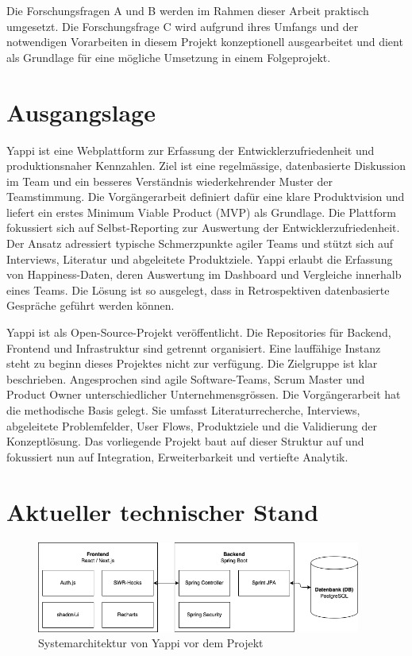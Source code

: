 \documentclass[12pt,a4paper]{report}
\begin{document}
Die Forschungsfragen A und B werden im Rahmen dieser Arbeit praktisch umgesetzt. Die Forschungsfrage C wird aufgrund ihres Umfangs
und der notwendigen Vorarbeiten in diesem Projekt konzeptionell ausgearbeitet und dient als Grundlage für eine mögliche Umsetzung
in einem Folgeprojekt.

\section{Ausgangslage}

Yappi ist eine Webplattform zur Erfassung der Entwicklerzufriedenheit und produktionsnaher Kennzahlen. Ziel ist eine regelmässige,
datenbasierte Diskussion im Team und ein besseres Verständnis wiederkehrender Muster der Teamstimmung. Die Vorgängerarbeit
definiert dafür eine klare Produktvision und liefert ein erstes Minimum Viable Product (MVP) als Grundlage. Die Plattform 
fokussiert sich auf Selbst-Reporting zur Auswertung der Entwicklerzufriedenheit. Der Ansatz adressiert typische Schmerzpunkte
agiler Teams und stützt sich auf Interviews, Literatur und abgeleitete Produktziele. Yappi erlaubt die Erfassung von
Happiness-Daten, deren Auswertung im Dashboard und Vergleiche innerhalb eines Teams. Die Lösung ist so ausgelegt, dass in
Retrospektiven datenbasierte Gespräche geführt werden können.

Yappi ist als Open-Source-Projekt veröffentlicht. Die Repositories für Backend, Frontend und Infrastruktur sind getrennt 
organisiert. Eine lauffähige Instanz steht zu beginn dieses Projektes nicht zur verfügung. Die Zielgruppe ist klar beschrieben. 
Angesprochen sind agile Software-Teams, Scrum Master und Product Owner unterschiedlicher Unternehmensgrössen. Die Vorgängerarbeit
hat die methodische Basis gelegt. Sie umfasst Literaturrecherche, Interviews, abgeleitete Problemfelder, User Flows, Produktziele
und die Validierung der Konzeptlösung. Das vorliegende Projekt baut auf dieser Struktur auf und fokussiert nun auf Integration,
Erweiterbarkeit und vertiefte Analytik.

\section{Aktueller technischer Stand}

\begin{figure}[H]
  \centering
  \includegraphics[width=0.95\textwidth]{../figures/before-system-diagram.drawio.png}
  \caption{Systemarchitektur von Yappi vor dem Projekt}
  \label{fig:systemarchitektur}
\end{figure}
\end{document}
